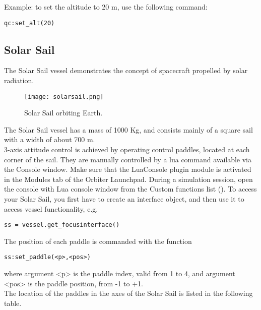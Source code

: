 \documentclass[Orbiter User Manual.tex]{subfiles}
\begin{document}
\noindent
Example: to set the altitude to 20 m, use the following command:

\begin{lstlisting}[language=OSFS]
qc:set_alt(20)
\end{lstlisting}


\subsection{Solar Sail}
The Solar Sail vessel demonstrates the concept of spacecraft propelled by solar radiation.\\


\begin{figure}[H]
  \centering
  \texttt{[image: solarsail.png]}
  \caption{Solar Sail orbiting Earth.}
\end{figure}

\noindent
The Solar Sail vessel has a mass of 1000 Kg, and consists mainly of a square sail with a width of about 700 m.\\
3-axis attitude control is achieved by operating control paddles, located at each corner of the sail. They are manually controlled by a lua command available via the Console window. Make sure that the LuaConsole plugin module is activated in the Modules tab of the Orbiter Launchpad. During a simulation session, open the console with Lua console window from the Custom functions list (\Ctrl{}). To access your Solar Sail, you first have to create an interface object, and then use it to access vessel functionality, e.g.

\begin{lstlisting}[language=OSFS]
ss = vessel.get_focusinterface()
\end{lstlisting}

\noindent
The position of each paddle is commanded with the function

\begin{lstlisting}[language=OSFS]
ss:set_paddle(<p>,<pos>)
\end{lstlisting}

\noindent
where argument <p> is the paddle index, valid from 1 to 4, and argument <pos> is the paddle position, from -1 to +1.\\
The location of the paddles in the axes of the Solar Sail is listed in the following table.
\end{document}
